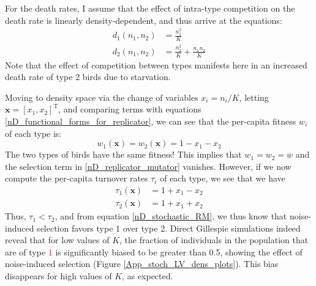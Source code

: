For the death rates, I assume that the effect of intra-type competition on the death rate is linearly density-dependent, and thus arrive at the equations:
\begin{equation}
\label{App_example_stoch_LV_death_rates}
\begin{aligned}
	d_{1}({n_1},{n_2}) &= \frac{{n_1^2}}{K}\\
	d_{2}({n_1},{n_2}) &= \frac{{n_2^2}}{K} + \frac{{n_1}{n_2}}{K}
\end{aligned}
\end{equation}
Note that the effect of competition between types manifests here in an increased death rate of type 2 birds due to starvation.

Moving to density space via the change of variables $x_i = n_i/K$, letting $\mathbf{x} = [x_1, x_2]^{\mathrm{T}}$, and comparing terms with equations \eqref{nD_functional_forms_for_replicator}, we can see that the per-capita fitness $w_i$ of each type is:
\begin{equation*}
	w_{1}(\mathbf{x}) = w_{2}(\mathbf{x}) = 1 - x_1 - x_2
\end{equation*}
The two types of birds have the same fitness! This implies that $w_1 = w_2 = \overline{w}$ and the selection term in \eqref{nD_replicator_mutator} vanishes.
However, if we now compute the per-capita turnover rates $\tau_i$  of each type, we see that we have
\begin{align*}
	\tau_{1}(\mathbf{x}) &= 1 + x_1 - x_2\\
	\tau_{2}(\mathbf{x}) &= 1 + x_1 + x_2
\end{align*}
Thus, $\tau_{1} < \tau_{2}$, and from equation \eqref{nD_stochastic_RM}, we thus know that noise-induced selection favors type 1 over type 2.
Direct Gillespie simulations indeed reveal that for low values of $K$, the fraction of individuals in the population that are of type \textcolor{red}{1} is significantly biased to be greater than 0.5, showing the effect of noise-induced selection (Figure \ref{App_stoch_LV_dens_plots}). This bias disappears for high values of $K$, as expected.

